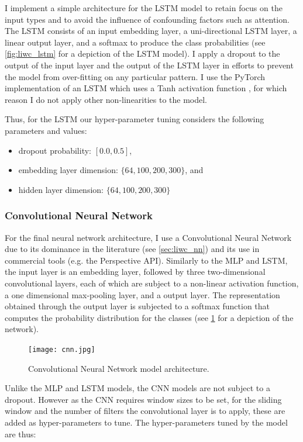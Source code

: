 I implement a simple architecture for the LSTM model to retain focus on the input types and to avoid the influence of confounding factors such as attention. The LSTM consists of an input embedding layer, a uni-directional LSTM layer, a linear output layer, and a softmax to produce the class probabilities (see \autoref{fig:liwc_lstm} for a depiction of the LSTM model).
I apply a dropout to the output of the input layer and the output of the LSTM layer in efforts to prevent the model from over-fitting on any particular pattern. I use the PyTorch implementation of an LSTM which uses a Tanh activation function \citep{Paszke:2019}, for which reason I do not apply other non-linearities to the model.

Thus, for the LSTM our hyper-parameter tuning considers the following parameters and values:

\begin{itemize}
  \item dropout probability: $[0.0, 0.5]$,
  \item embedding layer dimension: $\{64, 100, 200, 300\}$, and
  \item hidden layer dimension: $\{64, 100, 200, 300\}$
\end{itemize}

\subsubsection{Convolutional Neural Network}

For the final neural network architecture, I use a Convolutional Neural Network due to its dominance in the literature (see \cref{sec:liwc_nn}) and its use in commercial tools (e.g. the Perspective API). Similarly to the MLP and LSTM, the input layer is an embedding layer, followed by three two-dimensional convolutional layers, each of which are subject to a non-linear activation function, a one dimensional max-pooling layer, and a output layer. The representation obtained through the output layer is subjected to a softmax function that computes the probability distribution for the classes (see \cref{fig:liwc_cnn} for a depiction of the network).

\begin{figure}
  \centering
  \texttt{[image: cnn.jpg]}
  \caption{Convolutional Neural Network model architecture.}
  \label{fig:liwc_cnn}
\end{figure}

Unlike the MLP and LSTM models, the CNN models are not subject to a dropout. However as the CNN requires window sizes to be set, for the sliding window and the number of filters the convolutional layer is to apply, these are added as hyper-parameters to tune. The hyper-parameters tuned by the model are thus:

